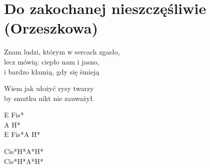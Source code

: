 \section{Do zakochanej nieszczęśliwie (Orzeszkowa)}
\begin{text}
Znam ludzi, którym w sercach zgasło,\\
lecz mówią: ciepło nam i jasno,\\
i bardzo kłamią, gdy się śmieją

Wiem jak ułożyć rysy twarzy\\
by smutku nikt nie zauważył.
\end{text}
\begin{chord}
E Fis*\\
A H*\\
E Fis*A H*

Cis*H*A*H*\\
Cis*H*A*H*
\end{chord}